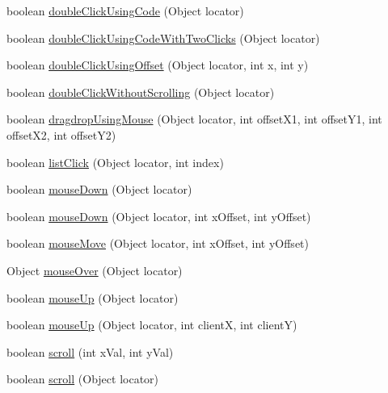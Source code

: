 \begin{DoxyCompactItemize}
\item 
boolean \hyperlink{interfacecom_1_1zeuslearning_1_1automation_1_1interactions_1_1IMouseOperations_a928202fe444c43e446a21baf312d40d9}{double\+Click\+Using\+Code} (Object locator)
\item 
boolean \hyperlink{interfacecom_1_1zeuslearning_1_1automation_1_1interactions_1_1IMouseOperations_af96d9b23c841ba11f4ba19d8c54444ec}{double\+Click\+Using\+Code\+With\+Two\+Clicks} (Object locator)
\item 
boolean \hyperlink{interfacecom_1_1zeuslearning_1_1automation_1_1interactions_1_1IMouseOperations_a1f5da55df87112de1018b7c2e2ea3207}{double\+Click\+Using\+Offset} (Object locator, int x, int y)
\item 
boolean \hyperlink{interfacecom_1_1zeuslearning_1_1automation_1_1interactions_1_1IMouseOperations_ace17e5ec881803e96a75495cc4d532ff}{double\+Click\+Without\+Scrolling} (Object locator)
\item 
boolean \hyperlink{interfacecom_1_1zeuslearning_1_1automation_1_1interactions_1_1IMouseOperations_a7fa2509bd7e1aeec9b88ef70a0f4c47a}{dragdrop\+Using\+Mouse} (Object locator, int offset\+X1, int offset\+Y1, int offset\+X2, int offset\+Y2)
\item 
boolean \hyperlink{interfacecom_1_1zeuslearning_1_1automation_1_1interactions_1_1IMouseOperations_a77d60ff998cd36e27cb131a0c54f1690}{list\+Click} (Object locator, int index)
\item 
boolean \hyperlink{interfacecom_1_1zeuslearning_1_1automation_1_1interactions_1_1IMouseOperations_aa1bf6db6bfa6e6f2ed2376433c42956a}{mouse\+Down} (Object locator)
\item 
boolean \hyperlink{interfacecom_1_1zeuslearning_1_1automation_1_1interactions_1_1IMouseOperations_a0a455b9b9ab29fdb0dded00e07e3c72c}{mouse\+Down} (Object locator, int x\+Offset, int y\+Offset)
\item 
boolean \hyperlink{interfacecom_1_1zeuslearning_1_1automation_1_1interactions_1_1IMouseOperations_a829975e5155ce0e29e14ee2c90470c6a}{mouse\+Move} (Object locator, int x\+Offset, int y\+Offset)
\item 
Object \hyperlink{interfacecom_1_1zeuslearning_1_1automation_1_1interactions_1_1IMouseOperations_a5e9e5bc4ccb27ca23924a3058c686374}{mouse\+Over} (Object locator)
\item 
boolean \hyperlink{interfacecom_1_1zeuslearning_1_1automation_1_1interactions_1_1IMouseOperations_ad30fa777ed68e069dc06a8ebb219eaed}{mouse\+Up} (Object locator)
\item 
boolean \hyperlink{interfacecom_1_1zeuslearning_1_1automation_1_1interactions_1_1IMouseOperations_a4b357f6c590c2fb044ebbe1916396ac2}{mouse\+Up} (Object locator, int clientX, int clientY)
\item 
boolean \hyperlink{interfacecom_1_1zeuslearning_1_1automation_1_1interactions_1_1IMouseOperations_a44c25625c78ee054e4aa26452183959a}{scroll} (int x\+Val, int y\+Val)
\item 
boolean \hyperlink{interfacecom_1_1zeuslearning_1_1automation_1_1interactions_1_1IMouseOperations_af08b8fe7ad0752c04b8760247e944158}{scroll} (Object locator)
\end{DoxyCompactItemize}


